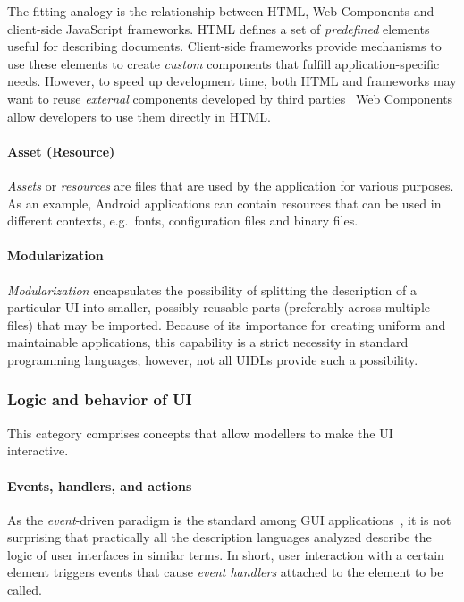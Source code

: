 The fitting analogy is the relationship between HTML, Web Components and client-side JavaScript frameworks.
HTML defines a set of \emph{predefined} elements useful for describing documents.
Client-side frameworks provide mechanisms to use these elements to create \emph{custom} components that fulfill application-specific needs.
However, to speed up development time, both HTML and frameworks may want to reuse \emph{external} components developed by third parties \textendash\ Web Components allow developers to use them directly in HTML\@.

\paragraph{Asset (Resource)}
\emph{Assets} or \emph{resources} are files that are used by the application for various purposes.
As an example, Android applications can contain resources that can be used in different contexts, e.g.\ fonts, configuration files and binary files.

\paragraph{Modularization}
\emph{Modularization} encapsulates the possibility of splitting the description of a particular UI into smaller, possibly reusable parts (preferably across multiple files) that may be imported.
Because of its importance for creating uniform and maintainable applications, this capability is a strict necessity in standard programming languages;
however, not all UIDLs provide such a possibility.

\subsubsection{Logic and behavior of UI}

This category comprises concepts that allow modellers to make the UI interactive.

\paragraph{Events, handlers, and actions}
As the \emph{event}-driven paradigm is the standard among GUI applications~\cite{wang2016event}, it is not surprising that practically all the description languages analyzed describe the logic of user interfaces in similar terms.
In short, user interaction with a certain element triggers events that cause \emph{event handlers} attached to the element to be called.

